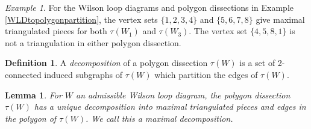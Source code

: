 \documentclass[11pt]{article}
\newtheorem{lem}[thm]{Lemma}
\theoremstyle{remark}
\newtheorem{eg}[thm]{Example}
\theoremstyle{definition}
\newtheorem{dfn}[thm]{Definition}
\begin{document}
\begin{eg} \label{eg: unique decomposition} For the Wilson loop diagrams and polygon dissections in Example \ref{WLDtopolygonpartition}, the vertex sets $\{1, 2, 3,4\}$ and $\{5, 6, 7, 8\}$ give maximal triangulated pieces for both $\tau(W_1)$ and $\tau(W_3)$. The vertex set $\{4,5, 8, 1\}$ is not a triangulation in either polygon dissection. 
\end{eg}

\begin{dfn}
 A {\em decomposition} of a polygon dissection $\tau(W)$ is a set of 2-connected induced subgraphs of $\tau(W)$ which partition the edges of $\tau(W)$.  
\end{dfn}

\begin{lem} \label{decompositionlem}
  For $W$ an admissible Wilson loop diagram, the polygon dissection $\tau(W)$ has a unique decomposition into maximal triangulated pieces and edges in the polygon of $\tau(W)$.  We call this a \emph{maximal decomposition}.
\end{lem}
\end{document}

